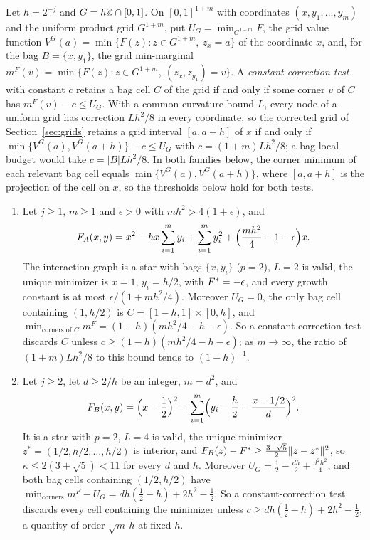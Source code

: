 Let $h=2^{-j}$ and $G=h\mathbb Z\cap[0,1]$. On $[0,1]^{1+m}$ with coordinates
$(x,y_1,\ldots,y_m)$ and the uniform product grid $G^{1+m}$, put
$U_G=\min_{G^{1+m}}F$, the grid value function
$V^G(a)=\min\{F(z):z\in G^{1+m},\ z_x=a\}$ of the coordinate $x$, and, for the
bag $B=\{x,y_1\}$, the grid min-marginal
$m^F(v)=\min\{F(z):z\in G^{1+m},\ (z_x,z_{y_1})=v\}$. A
\emph{constant-correction test} with constant $c$ retains a bag cell $C$ of
the grid if and only if some corner $v$ of $C$ has $m^F(v)-c\le U_G$. With a
common curvature bound $L$, every node of a uniform grid has correction
$Lh^2/8$ in every coordinate, so the corrected grid of
Section~\ref{sec:grids} retains a grid interval $[a,a+h]$ of $x$ if and only
if $\min\{V^G(a),V^G(a+h)\}-c\le U_G$ with $c=(1+m)Lh^2/8$; a bag-local
budget would take $c=|B|Lh^2/8$. In both families below, the corner minimum
of each relevant bag cell equals $\min\{V^G(a),V^G(a+h)\}$, where $[a,a+h]$
is the projection of the cell on $x$, so the thresholds below hold for both
tests.

\begin{proposition}\label{prop:star}
\leavevmode
\begin{enumerate}
\item[(A)] Let $j\ge1$, $m\ge1$ and $\epsilon>0$ with $mh^2>4(1+\epsilon)$,
and
\[
F_A(x,y)=x^2-hx\sum_{i=1}^my_i+\sum_{i=1}^my_i^2
+\Bigl(\frac{mh^2}4-1-\epsilon\Bigr)x .
\]
The interaction graph is a star with bags $\{x,y_i\}$ ($p=2$), $L=2$ is
valid, the unique minimizer is $x=1$, $y_i=h/2$, with $F^{*}=-\epsilon$, and
every growth constant is at most $\epsilon/(1+mh^2/4)$. Moreover $U_G=0$,
the only bag cell containing $(1,h/2)$ is $C=[1-h,1]\times[0,h]$, and
$\min_{\text{corners of }C}m^F=(1-h)(mh^2/4-h-\epsilon)$. So a
constant-correction test discards $C$ unless
$c\ge(1-h)(mh^2/4-h-\epsilon)$; as $m\to\infty$, the ratio of
$(1+m)Lh^2/8$ to this bound tends to $(1-h)^{-1}$.
\item[(B)] Let $j\ge2$, let $d\ge2/h$ be an integer, $m=d^2$, and
\[
F_B(x,y)=\Bigl(x-\frac12\Bigr)^2+\sum_{i=1}^m
\Bigl(y_i-\frac h2-\frac{x-1/2}{d}\Bigr)^2 .
\]
It is a star with $p=2$, $L=4$ is valid, the unique minimizer
$z^*=(1/2,h/2,\ldots,h/2)$ is interior, and
$F_B(z)-F^{*}\ge\frac{3-\sqrt5}2\lVert z-z^*\rVert^2$, so $\kappa\le2(3+\sqrt5)<11$
for every $d$ and $h$. Moreover $U_G=\frac12-\frac{dh}2+\frac{d^2h^2}4$, and
both bag cells containing $(1/2,h/2)$ have
$\min_{\text{corners}}m^F-U_G=dh(\frac12-h)+2h^2-\frac12$. So a
constant-correction test discards every cell containing the minimizer
unless $c\ge dh(\frac12-h)+2h^2-\frac12$, a quantity of order $\sqrt m\,h$
at fixed $h$.
\end{enumerate}
\end{proposition}

